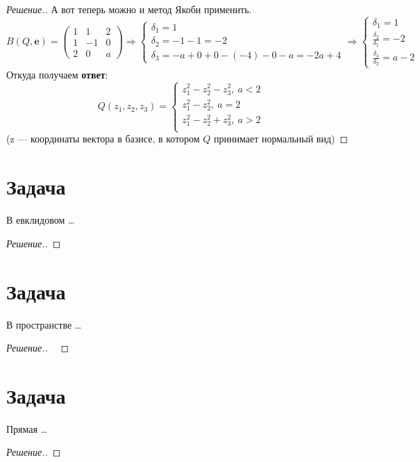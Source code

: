\documentclass[a4paper]{article}
\theoremstyle{remark}
\newcommand{\eq}[1]{\begin{cases} #1 \end{cases}}
\begin{document}
\begin{proof}[Решение.]
            А вот теперь можно и метод Якоби применить. 
            \[
                B(Q,\bm{e}) = 
                \begin{pmatrix}
                    1 & 1 & 2\\
                    1 & -1 & 0 \\
                    2 & 0 & a
                \end{pmatrix} 
                \Rightarrow 
                \eq{
                    \delta_1 = 1\\
                    \delta_2 = -1 - 1 = -2 \\
                    \delta_3 = -a + 0  + 0 - (-4) - 0 - a = -2a + 4
                } 
                \Rightarrow 
                \eq{
                    \delta_1 = 1\\
                    \frac{\delta_2}{\delta_1} = -2 \\
                    \frac{\delta_3}{\delta_2} = a - 2
                }
            \]
            Откуда получаем \textbf{ответ}: 
            \[
                Q(z_1, z_2, z_3) = \eq{
                    z_1^2 - z_2^2 - z_3^2, \ a < 2\\
                    z_1^2 - z_2^2, \ a = 2\\
                    z_1^2 - z_2^2 + z_3^2, \ a > 2\\}
            \] 
            (z --- координаты вектора в базисе, в котором $Q$ 
            принимает нормальный вид)

        \end{proof}
      
    \section*{Задача }
        В евклидовом \dots
        \begin{proof}[Решение.]
            
        \end{proof}
    
    \section*{Задача }
        В пространстве \dots
        \begin{proof}[Решение.] \ 

        \end{proof}

    \section*{Задача }
        Прямая \dots
        \begin{proof}[Решение.]
            
        \end{proof}
\end{document}
